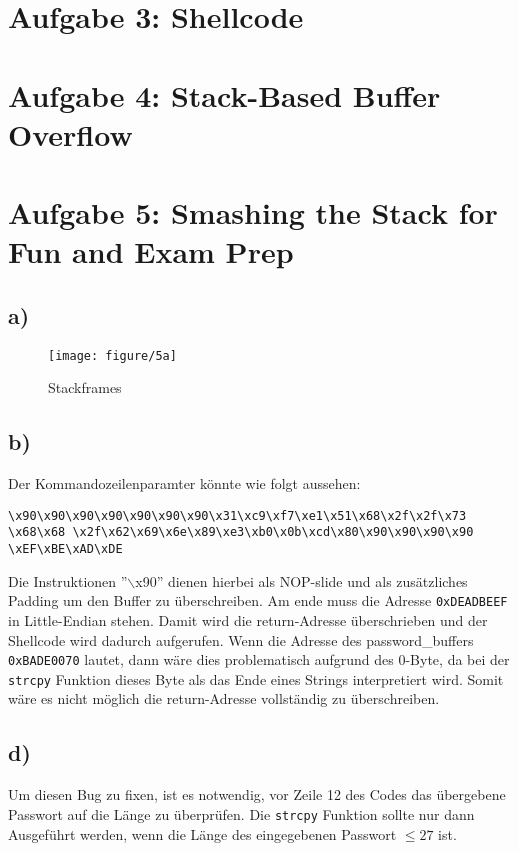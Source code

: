 \documentclass[]{scrreprt}
\begin{document}
\section*{Aufgabe 3: Shellcode}
\section*{Aufgabe 4: Stack-Based Buffer Overflow}
\section*{Aufgabe 5:  Smashing the Stack for Fun and Exam Prep}
\subsection*{a)}
\begin{figure}[h]
	\centering
	\texttt{[image: figure/5a]} %
	\caption{Stackframes}
\end{figure}
\subsection*{b)}
Der Kommandozeilenparamter könnte wie folgt aussehen:\newline
\begin{lstlisting}[caption={Kommandozeilenparamter ($\hat{=}$ einer Zeile)},captionpos=b]
\x90\x90\x90\x90\x90\x90\x90\x31\xc9\xf7\xe1\x51\x68\x2f\x2f\x73
\x68\x68 \x2f\x62\x69\x6e\x89\xe3\xb0\x0b\xcd\x80\x90\x90\x90\x90
\xEF\xBE\xAD\xDE
\end{lstlisting}
Die Instruktionen ''$\backslash$x90'' dienen hierbei als NOP-slide und als zusätzliches Padding um den Buffer zu überschreiben. Am ende muss die Adresse \texttt{0xDEADBEEF} in Little-Endian stehen. Damit wird die return-Adresse überschrieben und der Shellcode wird dadurch aufgerufen.\newline
Wenn die Adresse des password\_buffers \texttt{0xBADE0070} lautet, dann wäre dies problematisch aufgrund des 0-Byte, da bei der \texttt{strcpy} Funktion dieses Byte als das Ende eines Strings interpretiert wird. Somit wäre es nicht möglich die return-Adresse vollständig zu überschreiben.
\subsection*{d)}
Um diesen Bug zu fixen, ist es notwendig, vor Zeile 12 des Codes das übergebene Passwort auf die Länge zu überprüfen. Die \texttt{strcpy} Funktion sollte nur dann Ausgeführt werden, wenn die Länge des eingegebenen Passwort $\leq 27$ ist.
	
\end{document}
